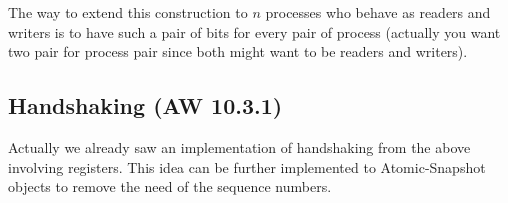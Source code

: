 \documentclass[twoside]{article}
\begin{document}
The way to extend this construction to $n$ processes who behave as readers and writers is to have such a pair of bits for every pair of process (actually you want two pair for process pair since both might want to be readers and writers).

\subsection{Handshaking (AW 10.3.1)}
Actually we already saw an implementation of handshaking from the above involving registers. This idea can be further implemented to Atomic-Snapshot objects to remove the need of the sequence numbers.  
\end{document}
